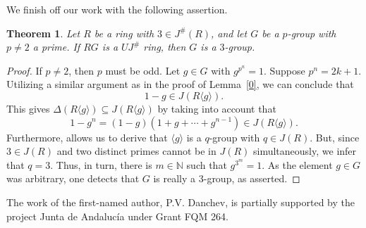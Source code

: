 \documentclass[12pt]{amsart}
\newtheorem{theorem}{Theorem}[section]
\theoremstyle{definition}
\begin{document}
We finish off our work with the following assertion.

\begin{theorem}\label{finone3}
Let $R$ be a ring with $3 \in J^{\#}(R)$, and let $G$ be a $p$-group with $p\neq 2$ a prime. If $RG$ is a $UJ^{\#}$ ring, then $G$ is a $3$-group.
\end{theorem}

\begin{proof}
If $p \neq 2$, then $p$ must be odd. Let $g \in G$ with $g^{p^n}=1$. Suppose $p^n=2k+1$. Utilizing a similar argument as in the proof of Lemma~\ref{0}, we can conclude that
\[
	1-g\in J(R\langle g\rangle).
\]
This gives $\Delta(R\langle g\rangle) \subseteq J(R\langle g\rangle)$ by taking into account that $$1-g^n=(1-g)(1+g + \cdots + g^{n-1}) \in J(R\langle g\rangle).$$ Furthermore, \cite[Proposition 15(i)]{con} allows us to derive that $\langle g\rangle$ is a $q$-group with $q \in J(R)$. But, since $3 \in J(R)$ and two distinct primes cannot be in $J(R)$ simultaneously, we infer that $q=3$. Thus, in turn, there is $m \in \mathbb{N}$ such that $g^{3^m}=1$. As the element $g \in G$ was arbitrary, one detects that $G$ is really a $3$-group, as asserted.
\end{proof}

\medskip
\medskip

 The work of the first-named author, P.V. Danchev, is partially supported by the project Junta de Andaluc\'ia under Grant FQM 264.

\vskip4.0pc
\end{document}
